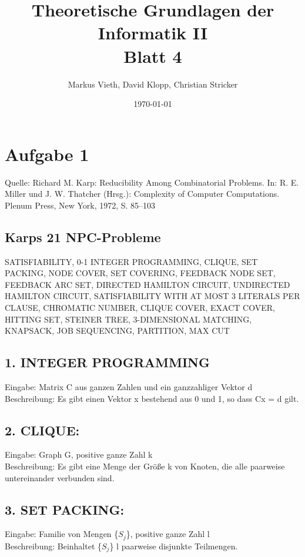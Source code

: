 \documentclass[a4paper,11pt,twoside]{article}
\title{Theoretische Grundlagen der Informatik II\\ Blatt 4}
\author{Markus Vieth, David Klopp, Christian Stricker}
\date{\today}
\begin{document}
\maketitle
\cleardoublepage
\pagestyle{myheadings}

\section*{Aufgabe 1}
Quelle: Richard M. Karp: Reducibility Among Combinatorial Problems. In: R. E. Miller und J. W. Thatcher (Hrsg.): Complexity of Computer Computations. Plenum Press, New York, 1972, S. 85–103
\subsection*{Karps 21 NPC-Probleme}
SATISFIABILITY, 0-1 INTEGER PROGRAMMING, CLIQUE, SET PACKING, NODE COVER, SET COVERING, FEEDBACK NODE SET, FEEDBACK ARC SET, DIRECTED HAMILTON CIRCUIT, UNDIRECTED HAMILTON CIRCUIT, SATISFIABILITY WITH AT MOST 3 LITERALS PER CLAUSE, CHROMATIC NUMBER, CLIQUE COVER, EXACT COVER, HITTING SET, STEINER TREE, 3-DIMENSIONAL MATCHING, KNAPSACK, JOB SEQUENCING, PARTITION, MAX CUT
\subsection*{1. INTEGER PROGRAMMING}
Eingabe: Matrix C aus ganzen Zahlen und ein ganzzahliger Vektor d \\
Beschreibung: Es gibt einen Vektor x bestehend aus 0 und 1, so dass Cx = d gilt.\\

\subsection*{2. CLIQUE:}
Eingabe: Graph G, positive ganze Zahl k\\
Beschreibung: Es gibt eine Menge der Größe k von Knoten, die alle paarweise untereinander verbunden sind.\\

\subsection*{3. SET PACKING:}
Eingabe: Familie von Mengen \{$S_j$\}, positive ganze Zahl l\\
Beschreibung: Beinhaltet \{$S_j$\} l paarweise disjunkte Teilmengen.\\
\end{document}
